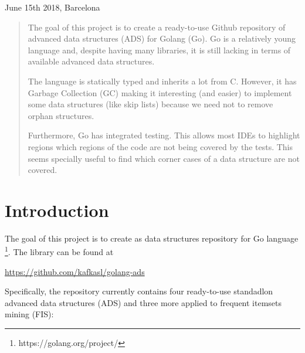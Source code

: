 \documentclass[a4paper,10pt,table,xcdraw]{article}
\begin{document}
\begin{titlepage}
         {June 15th 2018, Barcelona}\\[3cm] %
         \vfill %

\end{titlepage}

\newpage



\begin{abstract}
The goal of this project is to create a ready-to-use Github repository of advanced data structures (ADS) for Golang (Go). Go is a relatively young language and, despite having many libraries, it is still lacking in terms of available advanced data structures. 

The language is statically typed and inherits a lot from C. However, it has Garbage Collection (GC) making it interesting (and easier) to implement some data structures (like skip lists) because we need not to remove orphan structures.

Furthermore, Go has integrated testing. This allows most IDEs to highlight regions which regions of the code are not being covered by the tests. This seems specially useful to find which corner cases of a data structure are not covered.
\end{abstract}


\newpage

\setcounter{tocdepth}{3}
\tableofcontents

\newpage

\section{Introduction}

The goal of this project is to create as data structures repository for Go language \footnote{ https://golang.org/project/}. The library can be found at

\url{https://github.com/kafkasl/golang-ads}

Specifically, the repository currently contains four ready-to-use standadlon advanced data structures (ADS) and three more applied to frequent itemsets mining (FIS): 
\end{document}
